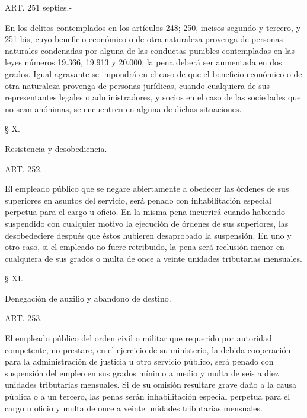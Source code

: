     ART. 251 septies.-

    En los delitos contemplados en los artículos 248; 250, incisos segundo y tercero, y 251 bis, cuyo beneficio económico o de otra naturaleza provenga de personas naturales condenadas por alguna de las conductas punibles contempladas en las leyes números 19.366, 19.913 y 20.000, la pena deberá ser aumentada en dos grados. Igual agravante se impondrá en el caso de que el beneficio económico o de otra naturaleza provenga de personas jurídicas, cuando cualquiera de sus representantes legales o administradores, y socios en el caso de las sociedades que no sean anónimas, se encuentren en alguna de dichas situaciones.

    § X.

    Resistencia y desobediencia.





    ART. 252.

    El empleado público que se negare abiertamente a obedecer las órdenes de sus superiores en asuntos del servicio, será penado con inhabilitación especial perpetua para el cargo u oficio.
    En la misma pena incurrirá cuando habiendo suspendido con cualquier motivo la ejecución de órdenes de sus superiores, las desobedeciere después que éstos hubieren desaprobado la suspensión.
    En uno y otro caso, si el empleado no fuere retribuido, la pena será reclusión menor en cualquiera de sus grados o multa de once a veinte unidades tributarias mensuales.







    § XI.

    Denegación de auxilio y abandono de destino.





    ART. 253.

    El empleado público del orden civil o militar que requerido por autoridad competente, no prestare, en el ejercicio de su ministerio, la debida cooperación para la administración de justicia u otro servicio público, será penado con suspensión del empleo en sus grados mínimo a medio y multa de seis a diez unidades tributarias mensuales.
    Si de su omisión resultare grave daño a la causa pública o a un tercero, las penas serán inhabilitación especial perpetua para el cargo u oficio y multa de once a veinte unidades tributarias mensuales.






